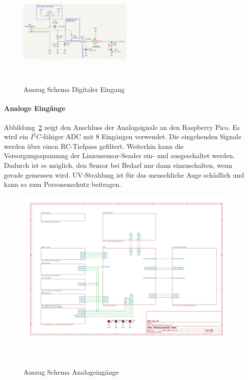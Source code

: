 \documentclass[main.  tex]{subfiles} %
\begin{document}
\begin{figure}[H]
    \centering
    \includegraphics[width=0.5\textwidth]{./fig_Antriebe/Schema_DIN_Umschaltbar.png}
    \caption{Auszug Schema Digitaler Eingang}~\label{fig:Schema_DInput}
\end{figure}

\newpage

\paragraph{Analoge Eingänge}
Abbildung~\ref{fig:Schema_AIn} zeigt den Anschluss der Analogsignale an den
Raspberry Pico. Es wird ein $I^2C$-fähiger ADC mit 8 Eingängen verwendet. Die
eingehenden Signale werden über einen RC-Tiefpass gefiltert. Weiterhin kann die
Versorgungsspannung der Liniensensor-Sender ein- und ausgeschaltet werden.
Dadurch ist es möglich, den Sensor bei Bedarf nur dann einzuschalten, wenn
gerade gemessen wird. UV-Strahlung ist für das menschliche Auge schädlich und
kann so zum Personenschutz beitragen.

\begin{figure}[H]
    \centering
    \includegraphics[page=7,width=\textwidth]{../Anhang_pdfs/MotionController.pdf}
    \caption{Auszug Schema Analogeingänge}~\label{fig:Schema_AIn}
\end{figure}
\end{document}
